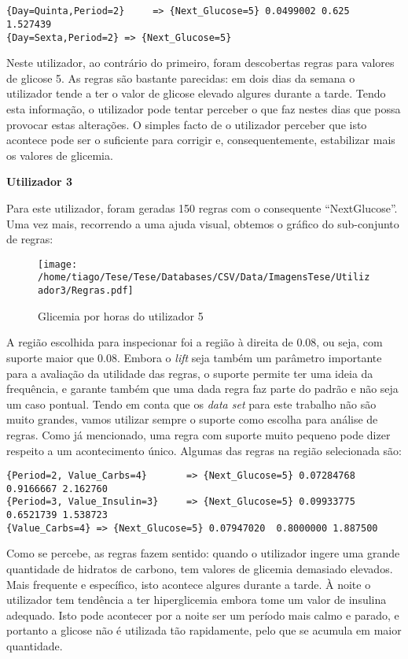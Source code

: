 \begin{lstlisting}


{Day=Quinta,Period=2}     => {Next_Glucose=5} 0.0499002 0.625      1.527439
{Day=Sexta,Period=2} => {Next_Glucose=5}

\end{lstlisting}
Neste utilizador, ao contrário do primeiro, foram descobertas regras para valores de glicose 5. As regras são bastante parecidas: em dois dias da semana o utilizador tende a ter o valor de glicose elevado algures durante a tarde. Tendo esta informação, o utilizador pode tentar perceber o que faz nestes dias que possa provocar estas alterações. O simples facto de o utilizador perceber que isto acontece pode ser o suficiente para corrigir e, consequentemente, estabilizar mais os valores de glicemia.


\textbf{Utilizador 3}

Para este utilizador, foram geradas 150 regras com o consequente ``Next\textunderscore Glucose''. Uma vez mais, recorrendo a uma ajuda visual, obtemos o gráfico do sub-conjunto de regras:


\begin{figure}[H]
\centering
\texttt{[image: /home/tiago/Tese/Tese/Databases/CSV/Data/ImagensTese/Utilizador3/Regras.pdf]}
\caption{Glicemia por horas do utilizador 5}
\end{figure}
A região escolhida para inspecionar foi a região à direita de 0.08, ou seja, com suporte maior que 0.08. Embora o \textit{lift} seja também um parâmetro importante para a avaliação da utilidade das regras, o suporte permite ter uma ideia da frequência, e garante também que uma dada regra faz parte do padrão e não seja um caso pontual. Tendo em conta que os \textit{data set} para este trabalho não são muito grandes, vamos utilizar sempre o suporte como escolha para análise de regras. Como já mencionado, uma regra com suporte muito pequeno pode dizer respeito a um acontecimento único. Algumas das regras na região selecionada são:

\begin{lstlisting}
{Period=2, Value_Carbs=4}       => {Next_Glucose=5} 0.07284768  0.9166667 2.162760  
{Period=3, Value_Insulin=3}     => {Next_Glucose=5} 0.09933775  0.6521739 1.538723
{Value_Carbs=4} => {Next_Glucose=5} 0.07947020  0.8000000 1.887500
\end{lstlisting}
Como se percebe, as regras fazem sentido: quando o utilizador ingere uma grande quantidade de hidratos de carbono, tem valores de glicemia demasiado elevados. Mais frequente e específico, isto acontece algures durante a tarde. À noite o utilizador tem tendência a ter hiperglicemia embora tome um valor de insulina adequado. Isto pode acontecer por a noite ser um período mais calmo e parado, e portanto a glicose não é utilizada tão rapidamente, pelo que se acumula em maior quantidade. 

